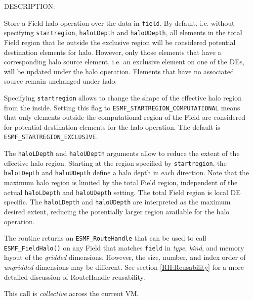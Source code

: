 {\sf DESCRIPTION:\\ }


     Store a Field halo operation over the data in {\tt field}. By default,
     i.e. without specifying {\tt startregion}, {\tt haloLDepth} and
     {\tt haloUDepth}, all elements in the total Field region that lie outside
     the exclusive region will be considered potential destination elements for
     halo. However, only those elements that have a corresponding halo source
     element, i.e. an exclusive element on one of the DEs, will be updated under
     the halo operation. Elements that have no associated source remain 
     unchanged under halo.
  
     Specifying {\tt startregion} allows to change the shape of the 
     effective halo region from the inside. Setting this flag to
     {\tt ESMF\_STARTREGION\_COMPUTATIONAL} means that only elements outside 
     the computational region of the Field are considered for potential
     destination elements for the halo operation. The default is {\tt ESMF\_STARTREGION\_EXCLUSIVE}.
  
     The {\tt haloLDepth} and {\tt haloUDepth} arguments allow to reduce
     the extent of the effective halo region. Starting at the region specified
     by {\tt startregion}, the {\tt haloLDepth} and {\tt haloUDepth}
     define a halo depth in each direction. Note that the maximum halo region is
     limited by the total Field region, independent of the actual
     {\tt haloLDepth} and {\tt haloUDepth} setting. The total Field region is
     local DE specific. The {\tt haloLDepth} and {\tt haloUDepth} are interpreted
     as the maximum desired extent, reducing the potentially larger region
     available for the halo operation.
  
     The routine returns an {\tt ESMF\_RouteHandle} that can be used to call 
     {\tt ESMF\_FieldHalo()} on any Field that matches 
     {\tt field} in {\em type}, {\em kind}, and 
     memory layout of the {\em gridded} dimensions. However, the size, number, 
     and index order of {\em ungridded} dimensions may be different. See section
     \ref{RH:Reusability} for a more detailed discussion of RouteHandle 
     reusability.
    
     This call is {\em collective} across the current VM.  
  
